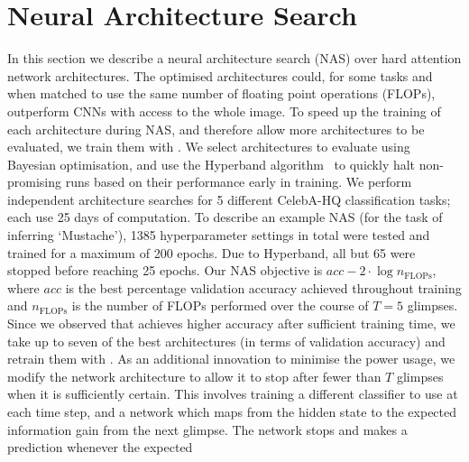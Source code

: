 \section{Neural Architecture Search} \label{sec:nogs-nas}

In this section we describe a neural architecture search (NAS) over hard
attention network architectures. The optimised architectures could, for some
tasks and when matched to use the same number of floating point operations
(FLOPs), outperform CNNs with access to the whole image.
%
To speed up the training of each architecture during NAS, and therefore allow
more architectures to be evaluated, we train them with \PSNOGS{}. We select
architectures to evaluate using Bayesian optimisation, and use the Hyperband
algorithm~\cite{li2017hyperband} to quickly halt non-promising runs based on
their performance early in training. We perform independent architecture
searches for 5 different CelebA-HQ classification tasks; each use 25 days of
computation. To describe an example NAS (for the task of inferring `Mustache'),
1385 hyperparameter settings in total were tested and trained for a maximum of
200 epochs. Due to Hyperband, all but 65 were stopped before reaching 25 epochs.
Our NAS objective is $acc - 2 \cdot \log n_\text{FLOPs}$, where $acc$ is the
best percentage validation accuracy achieved throughout training and
$n_\text{FLOPs}$ is the number of FLOPs performed over the course of $T=5$
glimpses. Since we observed that \WSRAM{} achieves higher accuracy after
sufficient training time, we take up to seven of the best architectures (in
terms of validation accuracy) and retrain them with \WSRAM{}. As an additional
innovation to minimise the power usage, we modify the network architecture to
allow it to stop after fewer than $T$ glimpses when it is sufficiently certain.
This involves training a different classifier to use at each time step, and a
network which maps from the hidden state to the expected information gain from
the next glimpse. The network stops and makes a prediction whenever the expected
